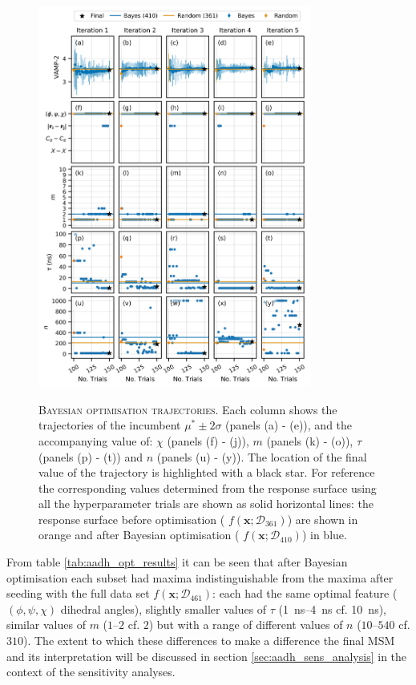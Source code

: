\begin{figure}[p]
    \centering
    \caption[Bayesian optimisation trajectories]{\textsc{Bayesian optimisation trajectories}. Each column shows the trajectories of the incumbent $\mu^{*} \pm  2\sigma$ (panels (a) - (e)), and the accompanying value of: $\chi$ (panels (f) - (j)), $m$ (panels (k) - (o)), $\tau$ (panels (p) - (t)) and $n$ (panels (u) - (y)). The location of the final value of the trajectory is highlighted with a black star. For reference the corresponding values determined from the response surface using all the hyperparameter trials are shown as solid horizontal lines: the response surface before optimisation ( $f\left(\mathbf{x}; \mathcal{D}_{361}\right)$) are shown in orange and after Bayesian optimisation ( $f\left(\mathbf{x}; \mathcal{D}_{410}\right)$) in blue.}
    \includegraphics[width=0.8\textwidth]{chapters/msm_optimization/figures/aadh_opt_traj_act_s_d.png}
    \label{fig:aadh_opt_traj_d}
\end{figure}

From  table \ref{tab:aadh_opt_results} it can be seen that after Bayesian optimisation each subset had maxima indistinguishable from the maxima after seeding with the full data set $f\left(\mathbf{x};\mathcal{D}_{461}\right)$: each had the same optimal feature ($(\phi, \psi, \chi)$ dihedral angles), slightly smaller values of $\tau$ (\SIrange{1}{4}{\nano\second} cf. \SI{10}{\nano\second}), similar values of $m$ ($\numrange[range-phrase=--]{1}{2}$ cf. $2$) but with a range of different values of $n$ ($\numrange[range-phrase=--]{10}{540}$ cf. $310$). The extent to which these differences to make a difference the final MSM and its interpretation will be discussed in section \ref{sec:aadh_sens_analysis} in the context of the sensitivity analyses.

